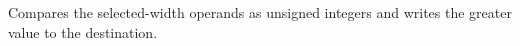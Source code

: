 Compares the selected-width operands as unsigned integers and writes the greater value to the destination.
